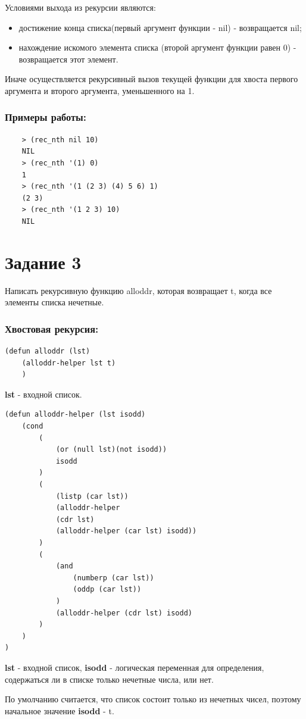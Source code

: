 \documentclass[a4paper, 12pt]{article}
\begin{document}
Условиями выхода из рекурсии являются:
\begin{itemize}
	\item достижение конца списка(первый аргумент функции - nil) - возвращается nil;
	\item нахождение искомого элемента списка (второй аргумент функции равен 0) - возвращается этот элемент. 
\end{itemize} 
Иначе осуществляется рекурсивный вызов текущей функции для хвоста первого аргумента и второго аргумента, уменьшенного на 1.

\subsubsection*{Примеры работы:}
\begin{lstlisting}
	> (rec_nth nil 10)
	NIL
	> (rec_nth '(1) 0)
	1
	> (rec_nth '(1 (2 3) (4) 5 6) 1)
	(2 3)
	> (rec_nth '(1 2 3) 10)
	NIL
\end{lstlisting}

\section*{Задание 3}
Написать рекурсивную функцию alloddr, которая возвращает t, когда все элементы списка нечетные.

\subsubsection*{Хвостовая рекурсия:}
\begin{lstlisting}[caption=Функция-обертка проверки на нечетность всех элементов списка]
	(defun alloddr (lst)
	(alloddr-helper lst t)
	)
\end{lstlisting}
\textbf{lst} - входной список.
\begin{lstlisting}[caption=Функция проверки на нечетность всех элементов списка]
(defun alloddr-helper (lst isodd)
	(cond	
		(
			(or (null lst)(not isodd))
			isodd
		)
		(
			(listp (car lst))
			(alloddr-helper 
			(cdr lst) 
			(alloddr-helper (car lst) isodd))
		)
		(
			(and 
				(numberp (car lst))
				(oddp (car lst))
			)
			(alloddr-helper (cdr lst) isodd)
		)
	)
)
\end{lstlisting}
\textbf{lst} - входной список, \textbf{isodd} - логическая переменная для определения, содержаться ли в списке только нечетные числа, или нет.

По умолчанию считается, что список состоит только из нечетных чисел, поэтому начальное значение \textbf{isodd} - t.
\end{document}
